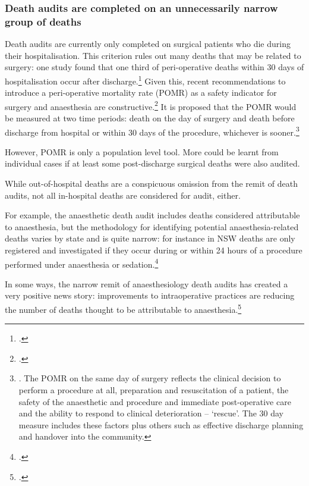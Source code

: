 \documentclass[FrontPage]{grattan}
\begin{document}
\subsubsection{Death audits are completed on an unnecessarily narrow group of deaths}
Death audits are currently only completed on surgical patients who die during their hospitalisation. This criterion rules out many deaths that may be related to surgery: one study found that one third of peri-operative deaths within 30 days of hospitalisation occur after discharge.\footcite[][22]{ariyaratnam2015toward}
Given this, recent recommendations to introduce a peri-operative mortality rate (POMR) as a safety indicator for surgery and anaesthesia are constructive.\footcites{ou2014trends}{watters2015perioperative}
It is proposed that the POMR would be measured at two time periods: death on the day of surgery and death before discharge from hospital or within 30 days of the procedure, whichever is sooner.\footnote{\textcites{watters2015perioperative}{ariyaratnam2015toward}. The POMR on the same day of surgery reflects the clinical decision to perform a procedure at all, preparation and resuscitation of a patient, the safety of the anaesthetic and procedure and immediate post-operative care and the ability to respond to clinical deterioration – ‘rescue’. The 30 day measure includes these factors plus others such as effective discharge planning and handover into the community.}

However, POMR is only a population level tool. More could be learnt from individual cases if at least some post-discharge surgical deaths were also audited.

While out-of-hospital deaths are a conspicuous omission from the remit of death audits, not all in-hospital deaths are considered for audit, either.

For example, the anaesthetic death audit includes deaths considered attributable to anaesthesia, but the methodology for identifying potential anaesthesia-related deaths varies by state and is quite narrow: for instance in NSW deaths are only registered and investigated if they occur during or within 24 hours of a procedure performed under anaesthesia or sedation.\footcite{mcnicol2014safety}

In some ways, the narrow remit of anaesthesiology death audits has created a very positive news story: improvements to intraoperative practices are reducing the number of deaths thought to be attributable to anaesthesia.\footcite{mcnicol2014safety}
\end{document}

